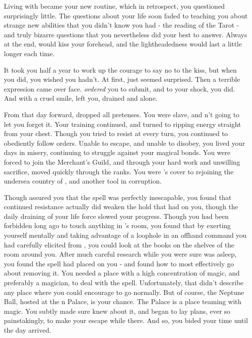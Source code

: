 \documentclass[char]{NeptuneBall}
\begin{document}
Living with \cWitch{\them} became your new routine, which in retrospect, you questioned surprisingly little. The questions about your life soon faded to \cWitch{\them} teaching you about strange new abilities that you didn't know you had - the reading of the Tarot - and truly bizarre questions that you nevertheless did your best to answer.  Always at the end, \cWitch{\they} would kiss your forehead, and the lightheadedness would last a little longer each time.

It took you half a year to work up the courage to say no to the kiss, but when you did, you wished you hadn't. At first, \cWitch{\they} just seemed surprised. Then a terrible expression came over \cWitch{\their} face. \cWitch{} \emph{ordered} you to submit, and to your shock, you did. And with a cruel smile, \cWitch{\they} left you, drained and alone.

From that day forward, \cWitch{} dropped all pretenses. You were \cWitch{\their} slave, and \cWitch{\they} \cWitch{\were}n't going to let you forget it. Your training continued, and \cWitch{\they} turned to ripping energy straight from your chest.  Though you tried to resist \cWitch{\them} at every turn, you continued to obediently follow orders. Unable to escape, and unable to disobey, you lived your days in misery, continuing to struggle against your magical bonds. You were forced to join the Merchant's Guild, and through your hard work and unwilling sacrifice, moved quickly through the ranks. You were \cWitch{}'s cover to rejoining the undersea country of \pAtlantis{}, and another tool in \cWitch{\their} corruption.

Though \cWitch{\they} assured you that the spell was perfectly inescapable, you found that continued resistance actually did weaken the hold that \cWitch{\they} had on you, though the daily draining of your life force slowed your progress. Though you had been forbidden long ago to touch anything in \cWitch{}'s room, you found that by exerting yourself mentally and taking advantage of a loophole in an offhand command you had carefully elicited from \cWitch{\them}, you could look at the books on the shelves of the room around you. After much careful research while you were sure \cWitch{} was asleep, you found the spell \cWitch{\they} had placed on you - and found how to most effectively go about removing it. You needed a place with a high concentration of magic, and preferably a magician, to deal with the spell. Unfortunately, that didn't describe any place where you could encourage \cWitch{} to go normally. But of course, the Neptune Ball, hosted at the \pAtlantis{}n Palace, is your chance. The Palace is a place teaming with magic. You subtly made sure \cWitch{} knew about it, and began to lay plans, ever so painstakingly, to make your escape while there. And so, you bided your time until the day arrived.
\end{document}
